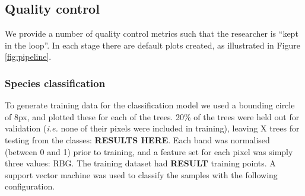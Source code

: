 \documentclass[9pt,lineno]{elife}
\begin{document}
\subsection{Quality control}
We provide a number of quality control metrics such that the researcher is ``kept in the loop''. In each stage there are default plots created, as illustrated in Figure \ref{fig:pipeline}.




\subsubsection{Species classification}
To generate training data for the classification model we used a bounding circle of 8px, and plotted these for each of the trees. 20\% of the trees were held out for validation (\textit{i.e.} none of their pixels were included in training), leaving X trees for testing from the classes: \textbf{RESULTS HERE}. Each band was normalised (between 0 and 1) prior to training, and a feature set for each pixel was simply three values: RBG. The training dataset had \textbf{RESULT} training points. A support vector machine was used to classify the samples with the following configuration.
\end{document}
